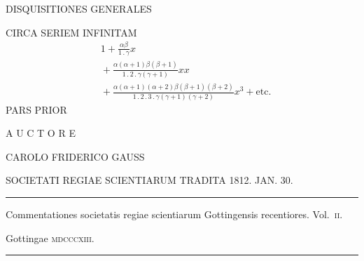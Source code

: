 \clearpage{}\thispagestyle{empty}
\begin{center}
DISQUISITIONES GENERALES

\medskip
CIRCA SERIEM INFINITAM
\[
\begin{aligned}&1+\frac{\alpha\beta}{1\mathbin{.}\gamma}x\\
&{}+\frac{\alpha(\alpha+1)\beta(\beta+1)}{1\mathbin{.}2\mathbin{.}\gamma(\gamma+1)}xx\\
&{}+\frac{\alpha(\alpha+1)(\alpha+2)\beta(\beta+1)(\beta+2)}{1\mathbin{.}2\mathbin{.}3\mathbin{.}\gamma(\gamma+1)(\gamma+2)}x^3+\mathrm{etc.}
\end{aligned}
\]
\bigskip
PARS PRIOR

\bigskip
A U C T O R E

\bigskip
CAROLO FRIDERICO GAUSS

\bigskip
SOCIETATI REGIAE SCIENTIARUM TRADITA 1812. JAN. 30.

\bigskip
\rule{0.7\linewidth}{0.4pt}

Commentationes societatis regiae scientiarum Gottingensis recentiores. Vol.~\textsc{ii}.

Gottingae \textsc{mdcccxiii}.

\rule{0.7\linewidth}{0.4pt}
\end{center}

